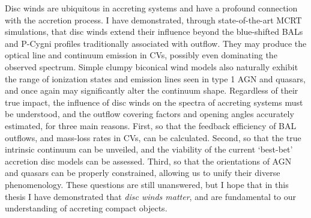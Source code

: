 Disc winds are ubiquitous in accreting systems and have a 
profound connection with the accretion process. I have demonstrated,
through state-of-the-art MCRT simulations, that disc winds extend their
influence beyond the blue-shifted BALs and P-Cygni profiles traditionally
associated with outflow. They may produce the optical line and continuum emission
in CVs, possibly even dominating the observed spectrum. Simple clumpy biconical
wind models also naturally exhibit the range of ionization states
and emission lines seen in type 1 AGN and quasars, and once again
may significantly alter the continuum shape. Regardless of their true
impact, the influence of disc winds on the spectra of accreting systems
must be understood, and the outflow covering factors and opening angles 
accurately estimated, for three main reasons. First, so that the feedback 
efficiency of BAL outflows, and mass-loss rates in CVs,
can be calculated. Second, so that the true intrinsic continuum can be unveiled, and 
the viability of the current `best-bet' accretion disc models can be assessed. 
Third, so that the orientations of AGN and quasars can be properly constrained,
allowing us to unify their diverse phenomenology. 
These questions are still unanswered, but I hope that in this thesis I have
demonstrated that {\em disc winds matter}, and are fundamental
to our understanding of accreting compact objects.










